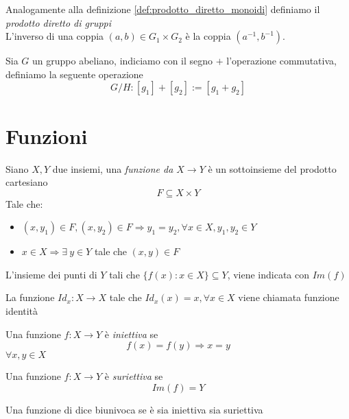         \begin{definition}
            Analogamente alla definizione \ref{def:prodotto_diretto_monoidi} definiamo il \emph{prodotto diretto di gruppi}\\
            L'inverso di una coppia $(a,b) \in G_1 \times G_2$ è la coppia $(a^{-1}, b^{-1})$.
        \end{definition}

        \begin{definition}
            Sia $G$ un gruppo abeliano, indiciamo con il segno $+$ l'operazione commutativa, definiamo la seguente operazione $$G/H : [g_1] + [g_2] := [g_1 + g_2]$$

        \end{definition}
    
    \section{Funzioni}
        \begin{definition}[Funzione]
            Siano $X,Y$ due insiemi, una \emph{funzione da $X \rightarrow Y$} è un sottoinsieme del prodotto cartesiano $$F \subseteq X\times Y$$
            Tale che:
            \begin{itemize}
                \item $(x,y_1) \in F, (x,y_2) \in F \Rightarrow y_1 = y_2, \forall x \in X, y_1,y_2 \in Y$
                \item $x \in X \Rightarrow \exists \ y \in Y$ tale che $(x,y) \in F$ 
            \end{itemize}
        \end{definition}
        \begin{definition}
            L'insieme dei punti di $Y$ tali che $\{f(x):x \in X\} \subseteq Y$, viene indicata con $Im(f)$
        \end{definition}
        \begin{definition}
            La funzione $Id_x : X \rightarrow X$ tale che $Id_x(x) = x, \forall x \in X$ viene chiamata funzione identità
        \end{definition}
        \begin{definition}
            Una funzione $f : X \rightarrow Y$ è \emph{iniettiva} se $$f(x)=f(y) \Rightarrow x=y$$ $\forall x,y \in X$
        \end{definition}
        \begin{definition}
            Una funzione $f : X \rightarrow Y$ è \emph{suriettiva} se $$Im(f)=Y$$ 
        \end{definition}
        \begin{definition}
            Una funzione di dice biunivoca se è sia iniettiva sia suriettiva
        \end{definition}
